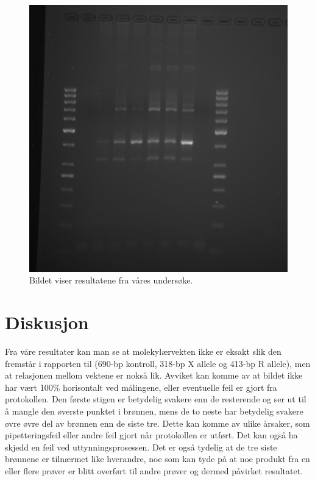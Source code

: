 \documentclass[
]{book}
\begin{document}
\begin{figure}
\centering
\includegraphics{images/Resultater.png}
\caption{Bildet viser resultatene fra våres undersøke.}
\end{figure}

\hypertarget{diskusjon-1}{%
\section{Diskusjon}\label{diskusjon-1}}

Fra våre resultater kan man se at molekylærvekten ikke er eksakt slik den fremstår i rapporten til \citet{schadock2015} (690-bp kontroll, 318-bp X allele og 413-bp R allele), men at relasjonen mellom vektene er nokså lik. Avviket kan komme av at bildet ikke har vært 100\% horisontalt ved målingene, eller eventuelle feil er gjort fra protokollen. Den første stigen er betydelig svakere enn de resterende og ser ut til å mangle den øverste punktet i brønnen, mens de to neste har betydelig svakere øvre øvre del av brønnen enn de siste tre. Dette kan komme av ulike årsaker, som pipetteringsfeil eller andre feil gjort når protokollen er utført. Det kan også ha skjedd en feil ved uttynningsprosessen. Det er også tydelig at de tre siste brønnene er tilnærmet like hverandre, noe som kan tyde på at noe produkt fra en eller flere prøver er blitt overført til andre prøver og dermed påvirket resultatet.

  
\end{document}
